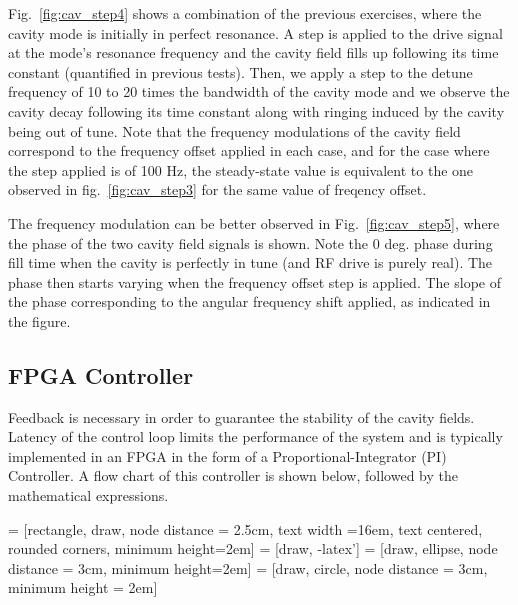 \documentclass[a4paper,12pt]{article}
\begin{document}
Fig.~\ref{fig:cav_step4} shows a combination of the previous exercises, where the cavity mode is initially in perfect resonance. A step is applied to the drive signal at the mode's resonance frequency and the cavity field fills up following its time constant (quantified in previous tests). Then, we apply a step to the detune frequency of 10 to 20 times the bandwidth of the cavity mode and we observe the cavity decay following its time constant along with ringing induced by the cavity being out of tune. Note that the frequency modulations of the cavity field correspond to the frequency offset applied in each case, and for the case where the step applied is of 100 Hz, the steady-state value is equivalent to the one observed in fig.~\ref{fig:cav_step3} for the same value of freqency offset.


The frequency modulation can be better observed in Fig.~\ref{fig:cav_step5}, where the phase of the two cavity field signals is shown. Note the 0 deg. phase during fill time when the cavity is perfectly in tune (and RF drive is purely real). The phase then starts varying when the frequency offset step is applied. The slope of the phase corresponding to the angular frequency shift applied, as indicated in the figure.

\subsection{FPGA Controller}

Feedback is necessary in order to guarantee the stability of the cavity fields. Latency of the control loop limits the performance of the system and is typically implemented in an FPGA in the form of a Proportional-Integrator (PI) Controller. A flow chart of this controller is shown below, followed by the mathematical expressions. 

 = [rectangle, draw, node distance = 2.5cm, text width =16em, text centered, rounded corners, minimum height=2em]
 = [draw, -latex']
 = [draw, ellipse,  node distance = 3cm, minimum height=2em]
 = [draw, circle, node distance = 3cm, minimum height = 2em]
\end{document}
